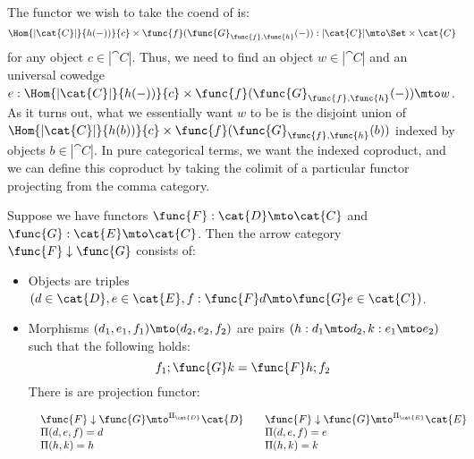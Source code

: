 The functor we wish to take the coend of is:
\[
    \Hom{|\cat{C}|}{h(-))}{c} \times \func{f}(\func{G}_{\func{f},\func{h}}(-)) : |\cat{C}| \mto \Set \times \cat{C}
\]
for any object $c \in |\cat{C}|$.  Thus, we need to find an object $w
\in |\cat{C}|$ and an universal cowedge $e : \Hom{|\cat{C}|}{h(-))}{c} \times \func{f}(\func{G}_{\func{f},\func{h}}(-)) \mto w$.
As it turns out, what we essentially want $w$ to be is the disjoint
union of $\Hom{|\cat{C}|}{h(b))}{c} \times
\func{f}(\func{G}_{\func{f},\func{h}}(b))$ indexed by objects $b \in
|\cat{C}|$.  In pure categorical terms, we want the indexed coproduct,
and we can define this coproduct by taking the colimit of a particular
functor projecting from the comma category.

\begin{definition}
\label{def:comma_category}
Suppose we have functors $\func{F} : \cat{D} \mto \cat{C}$ and
$\func{G} : \cat{E} \mto \cat{C}$.  Then the arrow category 
$\func{F} \downarrow \func{G}$ consists of:
\begin{itemize}
\item Objects are triples 
      $(d \in \cat{D}, e \in \cat{E}, 
        f : \func{F}d \mto \func{G}e \in \cat{C})$.
\item Morphisms $(d_1,e_1,f_1) \mto (d_2,e_2,f_2)$ are pairs 
      $(h : d_1 \mto d_2,k : e_1 \mto e_2)$ such that the following holds:
      \[
           f_1;\func{G}k = \func{F}h;f_2
      \]
      There is are projection functor:
      \begin{center}
        \begin{math}
            \begin{array}{lll}
                \begin{array}{lll}
                    \func{F} \downarrow \func{G} \mto^{\Pi_{\cat{D}}} \cat{D}\\
                    \Pi(d,e,f) = d\\
                    \Pi(h,k) = h
               \end{array}
               &
               \begin{array}{lll}
                    \func{F} \downarrow \func{G} \mto^{\Pi_{\cat{E}}} \cat{E}\\
                    \Pi(d,e,f) = e\\
                    \Pi(h,k) = k
               \end{array}
            \end{array}
        \end{math}
    \end{center}
\end{itemize}
\end{definition}
